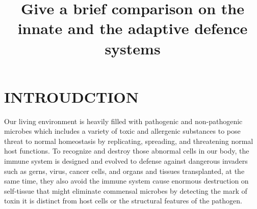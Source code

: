 \documentclass[12pt]{article}
\begin{document}
  
\title{\large Give a brief comparison on the innate and the adaptive defence systems \vspace{-2em}}
\date{\vspace{-2.5em}}
\maketitle

\section{INTROUDCTION}

Our living environment is heavily filled with pathogenic and non-pathogenic microbes which includes a variety of toxic and allergenic substances to pose threat to normal homeostasis by replicating, spreading, and threatening normal host functions. To recognize and destroy those abnormal cells in our body, the immune system is designed and evolved to defense against dangerous invaders such as gerns, virus, cancer cells, and organs and tissues transplanted, at the same time, they also avoid the immune system cause enormous destruction on self-tissue that might eliminate 
commensal microbes by detecting the mark of toxin it is distinct from host cells or the structural features of the pathogen.\medskip
\end{document}

